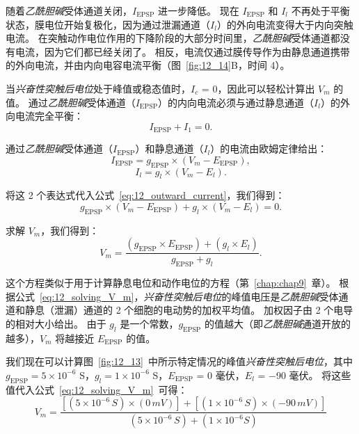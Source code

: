 随着\textit{乙酰胆碱}受体通道关闭，$I_{\text{EPSP}}$ 进一步降低。
现在 $I_{\text{EPSP}}$ 和 $ I_l $ 不再处于平衡状态，膜电位开始复极化，因为通过泄漏通道（$ I_l $）的外向电流变得大于内向突触电流。
在突触动作电位作用的下降阶段的大部分时间里，\textit{乙酰胆碱}受体通道都没有电流，因为它们都已经关闭了。
相反，电流仅通过膜传导作为由静息通道携带的外向电流，并由内向电容电流平衡（图~\ref{fig:12_14}B，时间 4）。


当\textit{兴奋性突触后电位}处于峰值或稳态值时，$ I_c $ = 0，因此可以轻松计算出 $V_m$ 的值。
通过\textit{乙酰胆碱}受体通道（$I_{\text{EPSP}}$）的内向电流必须与通过静息通道（$ I_l $）的外向电流完全平衡：
%
\begin{equation}\label{eq:12_outward_current}
	I_{\text{EPSP}} + I_1 = 0.
\end{equation}


通过\textit{乙酰胆碱}受体通道（$I_{\text{EPSP}}$）和静息通道（$ I_l $）的电流由欧姆定律给出：
\begin{equation}\label{eq:12_current_EPSP}
	I_{\text{EPSP}} = g_{\text{EPSP}} \times (V_m - E_{\text{EPSP}}),
\end{equation}
%
\begin{equation}\label{eq:12_current_resting}
	I_l = g_l \times (V_m - E_l).
\end{equation}

将这 2 个表达式代入公式~\ref{eq:12_outward_current}，我们得到：
\begin{equation}\label{eq:12_outward_current_substituting}
	g_{\text{EPSP}} \times (V_m - E_{\text{EPSP}}) + 
	g_l \times (V_m - E_l) = 0.
\end{equation}

求解 $V_m$，我们得到：
\begin{equation}\label{eq:12_solving_V_m}
	V_m = 
	\frac{
		(g_{\text{EPSP}} \times E_{\text{EPSP}}) + 
		(g_l \times E_l)
	}{
		g_{\text{EPSP}} + g_l
	}.
\end{equation}

这个方程类似于用于计算静息电位和动作电位的方程（第~\ref{chap:chap9}~章）。
根据公式~\ref{eq:12_solving_V_m}，\textit{兴奋性突触后电位}的峰值电压是\textit{乙酰胆碱}受体通道和静息（泄漏）通道的 2 个细胞的电动势的加权平均值。
加权因子由 2 个电导的相对大小给出。
由于 $ g_l $ 是一个常数，$ g_{\text{EPSP}} $ 的值越大（即\textit{乙酰胆碱}通道开放的越多），$V_m$ 将越接近 $E_{\text{EPSP}}$ 的值。


我们现在可以计算图~\ref{fig:12_13}~中所示特定情况的峰值\textit{兴奋性突触后电位}，其中 $ g_{\text{EPSP}} = 5 \times 10^{−6}$ S，$ g_l = 1 \times 10^{−6}$ S，$E_{\text{EPSP}}$ = 0 毫伏，$ E_l $ = −90 毫伏。
将这些值代入公式~\ref{eq:12_solving_V_m}~可得：
\begin{equation}\label{eq:12_substituting_V_m_1}
	V_m = 
	\frac{
		[
		(5 \times 10^{-6} \, \textit{S}) \times (0 \, \textit{mV})
		] 
		+ 
		[
			(1 \times 10^{-6} \, \textit{S}) \times
			(-90 \, \textit{mV})
		]
	}{
		(5 \times 10^{-6} \, \textit{S})
		+ 
		(1 \times 10^{-6} S)
	}
\end{equation}

